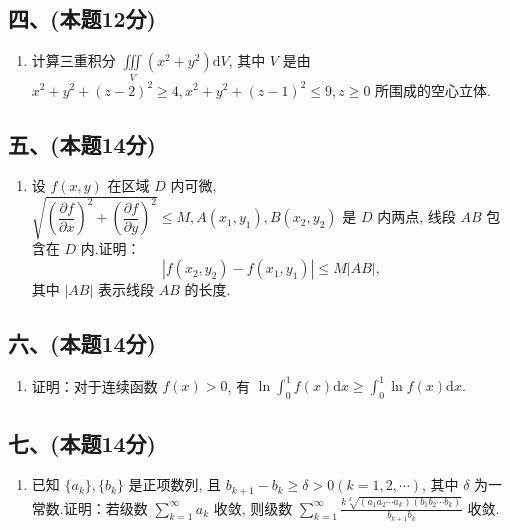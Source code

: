 \subsection*{四、(本题12分)}
\begin{enumerate}[start=7]
    \item 计算三重积分 $\displaystyle\iiint\limits_{V} (x^2 + y^2)  \mathrm{d}V$,  其中 $V$ 是由 $x^2 + y^2 + (z-2)^2 \geqslant 4,  x^2 + y^2 + (z-1)^2 \leqslant 9,  z \geqslant 0$ 所围成的空心立体.
\end{enumerate}

\subsection*{五、(本题14分)}
\begin{enumerate}[start=8]
    \item 设 $f(x,  y)$ 在区域 $D$ 内可微,  $\sqrt{\left( \dfrac{\partial f}{\partial x} \right)^2 + \left( \dfrac{\partial f}{\partial y} \right)^2} \leqslant M,  A(x_1,  y_1),  B(x_2,  y_2)$ 是 $D$ 内两点,  线段 $AB$ 包含在 $D$ 内.证明：
          \[
              |f(x_2,  y_2) - f(x_1,  y_1)| \leqslant M |AB|,
          \]
          其中 $|AB|$ 表示线段 $AB$ 的长度.
\end{enumerate}

\subsection*{六、(本题14分)}
\begin{enumerate}[start=9]
    \item 证明：对于连续函数 $f(x) > 0$,  有
          $\displaystyle \ln \int_0^1 f(x)  \mathrm{d}x \geqslant \int_0^1 \ln f(x)  \mathrm{d}x.$
\end{enumerate}

\subsection*{七、(本题14分)}
\begin{enumerate}[start=10]
    \item 已知 $\{a_k\},  \{b_k\}$ 是正项数列,  且 $b_{k+1} - b_k \geqslant \delta > 0 (k = 1,  2,  \cdots)$,  其中 $\delta$ 为一常数.证明：若级数 $\displaystyle\sum_{k=1}^{\infty} a_k$ 收敛,  则级数 $\displaystyle\sum_{k=1}^{\infty} \frac{k \sqrt[k]{(a_1 a_2 \cdots a_k)(b_1 b_2 \cdots b_k)}}{b_{k+1} b_k}$ 收敛.
\end{enumerate}


